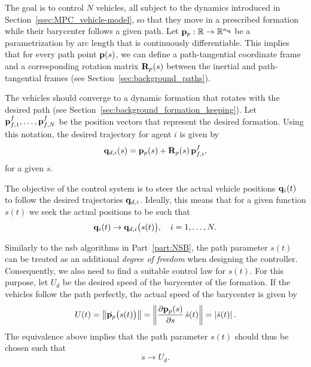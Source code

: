 The goal is to control $N$ vehicles, all subject to the dynamics introduced in Section~\ref{ssec:MPC_vehicle-model}, so that they move in a prescribed formation while their barycenter follows a given path.
Let $\mathbf{p}_p : \mathbb{R} \rightarrow \mathbb{R}^{n_{\mathbf{q}}}$ be a parametrization by arc length that is continuously differentiable.
This implies that for every path point $\mathbf{p}(s)$, we can define a path-tangential coordinate frame and a corresponding rotation matrix $\mathbf{R}_p(s)$ between the inertial and path-tangential frames (see Section~\ref{sec:background_paths}).

The vehicles should converge to a dynamic formation that rotates with the desired path (see Section~\ref{sec:background_formation_keeping}).
Let $\mathbf{p}_{f, 1}^f, \ldots, \mathbf{p}_{f, N}^f$ be the position vectors that represent the desired formation.
Using this notation, the desired trajectory for agent $i$ is given by
\begin{equation}
    \mathbf{q}_{d,i}(s) = \mathbf{p}_p(s) + \mathbf{R}_p(s)\, \mathbf{p}_{f, i}^f,
\end{equation} 
for a given $s$.

The objective of the control system is to steer the actual vehicle positions $\mathbf{q}_i(t)$ to follow the desired trajectories $\mathbf{q}_{d,i}$. Ideally, this means that for a given function $s(t)$ we seek the actual positions to be such that
\begin{equation}
    \mathbf{q}_i(t)
    \rightarrow
    \mathbf{q}_{d,i}\big(s(t)\big),
    \quad i = 1, \ldots, N.
    \label{eq:MPC_path_goal}
\end{equation} 

Similarly to the \gls{nsb} algorithms in Part~\ref{part:NSB}, the path parameter $s(t)$ can be treated as an additional \emph{degree of freedom} when designing the controller. Consequently, we also need to find a suitable control law for $s(t)$. For this purpose, let $U_d$ be the desired speed of the barycenter of the formation. %
If the vehicles follow the path perfectly, the actual speed of the barycenter is given by
\begin{equation}
    U(t)
    =
    \left\|\dot{\mathbf{p}_p} \big( s(t) \big)\right\|
    =
    \left\|\frac{\partial \mathbf{p}_p(s)}{\partial s}\,\dot{s}(t) \right\| = \left|\dot{s}(t)\right|.
\end{equation}
The equivalence above implies that the path parameter $s(t)$ should thus be chosen such that
\begin{equation}
    \dot{s} \rightarrow U_d.
    \label{eq:MPC_param_goal}
\end{equation}



